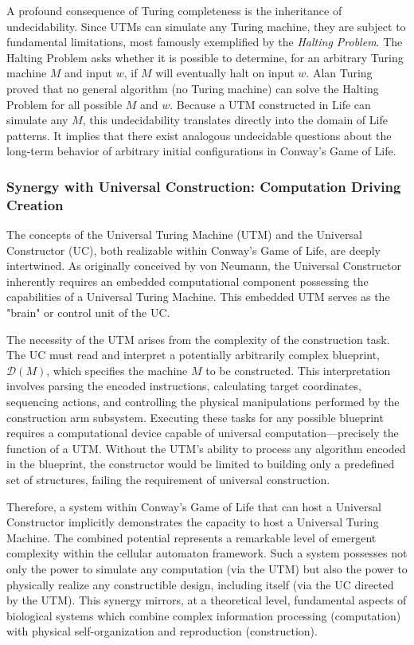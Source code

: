 \documentclass{article}
\theoremstyle{definition}
\theoremstyle{plain}
\theoremstyle{plain}
\begin{document}
A profound consequence of Turing completeness is the inheritance of undecidability. Since UTMs can simulate any Turing machine, they are subject to fundamental limitations, most famously exemplified by the \textit{Halting Problem}. The Halting Problem asks whether it is possible to determine, for an arbitrary Turing machine $M$ and input $w$, if $M$ will eventually halt on input $w$. Alan Turing proved that no general algorithm (no Turing machine) can solve the Halting Problem for all possible $M$ and $w$. Because a UTM constructed in Life can simulate any $M$, this undecidability translates directly into the domain of Life patterns. It implies that there exist analogous undecidable questions about the long-term behavior of arbitrary initial configurations in Conway's Game of Life.

\subsubsection{Synergy with Universal Construction: Computation Driving Creation}
The concepts of the Universal Turing Machine (UTM) and the Universal Constructor (UC), both realizable within Conway's Game of Life, are deeply intertwined. As originally conceived by von Neumann, the Universal Constructor inherently requires an embedded computational component possessing the capabilities of a Universal Turing Machine. This embedded UTM serves as the "brain" or control unit of the UC.

The necessity of the UTM arises from the complexity of the construction task. The UC must read and interpret a potentially arbitrarily complex blueprint, $\mathcal{D}(M)$, which specifies the machine $M$ to be constructed. This interpretation involves parsing the encoded instructions, calculating target coordinates, sequencing actions, and controlling the physical manipulations performed by the construction arm subsystem. Executing these tasks for any possible blueprint requires a computational device capable of universal computation—precisely the function of a UTM. Without the UTM's ability to process any algorithm encoded in the blueprint, the constructor would be limited to building only a predefined set of structures, failing the requirement of universal construction.

Therefore, a system within Conway's Game of Life that can host a Universal Constructor implicitly demonstrates the capacity to host a Universal Turing Machine. The combined potential represents a remarkable level of emergent complexity within the cellular automaton framework. Such a system possesses not only the power to simulate any computation (via the UTM) but also the power to physically realize any constructible design, including itself (via the UC directed by the UTM). This synergy mirrors, at a theoretical level, fundamental aspects of biological systems which combine complex information processing (computation) with physical self-organization and reproduction (construction).
\end{document}
